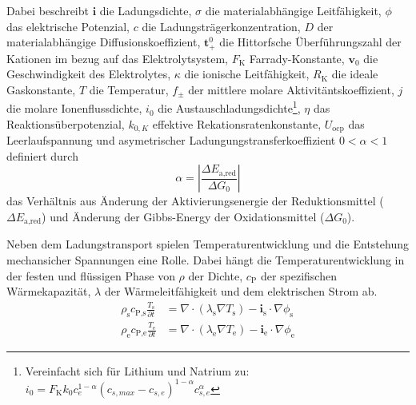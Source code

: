 Dabei beschreibt $\boldsymbol{i}$ die Ladungsdichte, $\sigma$ die materialabhängige  Leitfähigkeit, $\phi$ das elektrische Potenzial, $c$ die Ladungsträgerkonzentration, $D$ der materialabhängige Diffusionskoeffizient, $\boldsymbol{t}^0_+$ die Hittorfsche Überführungszahl der Kationen im bezug auf das Elektrolytsystem, $F_{\text{K}}$ Farrady-Konstante, $\boldsymbol{v}_0$ die Geschwindigkeit des Elektrolytes, $\kappa$ die ionische Leitfähigkeit, $R_{\text{K}}$ die ideale Gaskonstante, $T$ die Temperatur, $f_{\pm}$ der mittlere molare Aktivitäntskoeffizient, $j$ die molare Ionenflussdichte, $i_0$ die Austauschladungsdichte\footnote{Vereinfacht sich für Lithium und Natrium zu: $i_0 = F_{\text{K}} k_0 c_e^{1-\alpha} (c_{s,max}-c_{s,e})^{1-\alpha} c_{s,e}^\alpha$},  $\eta$ das Reaktionsüberpotenzial, $k_{0,K}$ effektive Rekationsratenkonstante, $U_{\text{ocp}}$ das Leerlaufspannung und asymetrischer Ladungungstransferkoeffizient $0<\alpha<1$ definiert durch
\begin{equation}
        \alpha = \left|\frac{\Delta E_{\text{a,red}}}{\Delta G_0}\right|
\end{equation}
das Verhältnis aus Änderung der Aktivierungsenergie der Reduktionsmittel ($\Delta E_{\text{a,red}}$) und Änderung der Gibbs-Energy der Oxidationsmittel ($\Delta G_0$).

Neben dem Ladungstransport spielen Temperaturentwicklung und die Entstehung mechansicher Spannungen eine Rolle.
Dabei hängt die Temperaturentwicklung in der festen und flüssigen Phase von $\rho$ der Dichte, $c_\text{P}$ der spezifischen Wärmekapazität, $\lambda$ der Wärmeleitfähigkeit und dem elektrischen Strom ab.
\begin{align}
    \rho_{\text{s}} c_{\text{P,s}} \frac{T_{\text{s}}}{\partial t} &= \nabla \cdot (\lambda_{\text{s}} \nabla T_{\text{s}}) - \boldsymbol{i}_{\text{s}} \cdot \nabla \phi_{\text{s}}\\
    \rho_{\text{e}} c_{\text{P,e}} \frac{T_{\text{e}}}{\partial t} &= \nabla \cdot (\lambda_{\text{e}} \nabla T_{\text{e}}) - \boldsymbol{i}_{\text{e}} \cdot \nabla \phi_{\text{e}}
\end{align}


